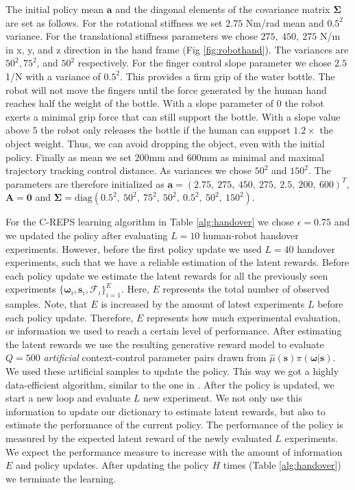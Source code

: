 The initial policy mean $\boldsymbol{a}$ and the diagonal elements of the covariance matrix $\boldsymbol{\Sigma}$ are set as follows. For the rotational stiffness we set $2.75$ Nm/rad mean and $0.5^2$ variance. For the translational stiffness parameters we chose $275,~450,~275$ N/m in x, y, and z direction in the hand frame (Fig \ref{fig:robothand}). The variances are $50^2, 75^2$, and $50^2$ respectively. For the finger control slope parameter we chose $2.5$ 1/N with a variance of $0.5^2$. This provides a firm grip of the water bottle. The robot will not move the fingers until the force generated by the human hand reaches half the weight of the bottle. With a slope parameter of $0$ the robot exerts a minimal grip force that can still support the bottle. With a slope value above $5$ the robot only releases the bottle if the human can support $1.2\times$ the object weight. Thus, we can avoid dropping the object, even with the initial policy. Finally as mean we set $200$mm and $600$mm as minimal and maximal trajectory tracking control distance. As variances we chose $50^2$ and $150^2$. The parameters are therefore initialized as $\boldsymbol{a} = (2.75,~ 275,~ 450,~275,~2.5,~200,~600)^T$, $\boldsymbol{A} = \boldsymbol{0}$ and $\boldsymbol{\Sigma} =
\mbox{diag}(0.5^2,~ 50^2,~75^2,~50^2,~0.5^2,~50^2,~150^2)$.

For the C-REPS learning algorithm in Table \ref{alg:handover} we chose
$\epsilon = 0.75$ and we updated the policy after evaluating $L = 10$ human-robot handover experiments. However, before the first policy update we used $L = 40$ handover experiments, such that we have a reliable estimation of the latent rewards. Before each policy update we estimate the latent rewards for all the previously seen experiments $\{ {\boldsymbol{\omega}} _i,   {\boldsymbol{s}} _i,
\mathcal{F}_i\}_{i=1}^E$. Here, $E$ represents the total number of observed samples. Note, that $E$ is increased by the amount of latest experiments $L$ before each policy update. Therefore, $E$ represents how much experimental evaluation, or information we used to reach a certain level of performance. After estimating the latent rewards we use the resulting generative reward model to evaluate $Q=500$ \emph{artificial} context-control parameter pairs drawn from  
$\hat{\mu}(  {\boldsymbol{s}} )\pi( {\boldsymbol{\omega}} |  {\boldsymbol{s}} )$.  We used these artificial samples to update the policy. This way we got a highly data-efficient algorithm, similar to the one in \citep{Kupcsik2013}. After the policy is updated, we start a new loop and evaluate $L$ new experiment. We not only use this information to update our dictionary to estimate latent rewards, but also to estimate the performance of the current policy. The performance of the policy is measured by the expected latent reward of the newly evaluated $L$ experiments. We expect the performance measure to increase with the amount of information $E$ and policy updates. After updating the policy $H$ times (Table \ref{alg:handover}) we terminate the learning.


